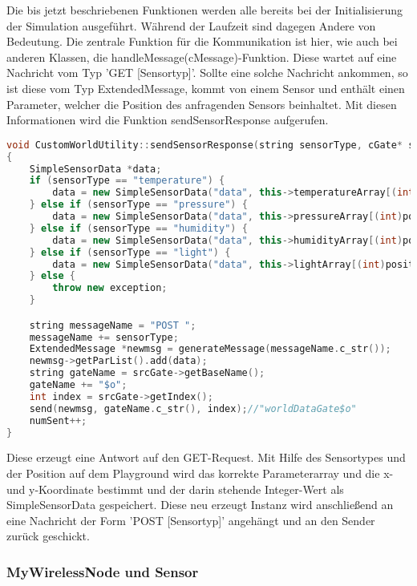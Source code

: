 Die bis jetzt beschriebenen Funktionen werden alle bereits bei der Initialisierung der Simulation ausgeführt. Während der Laufzeit sind dagegen Andere von Bedeutung. Die zentrale Funktion für die Kommunikation ist hier, wie auch bei anderen Klassen, die handleMessage(cMessage)-Funktion. \newline
Diese wartet auf eine Nachricht vom Typ 'GET [Sensortyp]'. Sollte eine solche Nachricht ankommen, so ist diese vom Typ ExtendedMessage, kommt von einem Sensor und enthält einen Parameter, welcher die Position des anfragenden Sensors beinhaltet. Mit diesen Informationen wird die Funktion sendSensorResponse aufgerufen.

\begin{lstlisting}[language=C++]
void CustomWorldUtility::sendSensorResponse(string sensorType, cGate* srcGate, SimpleCoord* position)
{
    SimpleSensorData *data;
    if (sensorType == "temperature") {
        data = new SimpleSensorData("data", this->temperatureArray[(int)position->x][(int)position->y]);
    } else if (sensorType == "pressure") {
        data = new SimpleSensorData("data", this->pressureArray[(int)position->x][(int)position->y]);
    } else if (sensorType == "humidity") {
        data = new SimpleSensorData("data", this->humidityArray[(int)position->x][(int)position->y]);
    } else if (sensorType == "light") {
        data = new SimpleSensorData("data", this->lightArray[(int)position->x][(int)position->y]);
    } else {
        throw new exception;
    }

    string messageName = "POST ";
    messageName += sensorType;
    ExtendedMessage *newmsg = generateMessage(messageName.c_str());
    newmsg->getParList().add(data);
    string gateName = srcGate->getBaseName();
    gateName += "$o";
    int index = srcGate->getIndex();
    send(newmsg, gateName.c_str(), index);//"worldDataGate$o"
    numSent++;
}
\end{lstlisting}

Diese erzeugt eine Antwort auf den GET-Request. Mit Hilfe des Sensortypes und der Position auf dem Playground wird das korrekte Parameterarray und die x- und y-Koordinate bestimmt und der darin stehende Integer-Wert als SimpleSensorData gespeichert.
Diese neu erzeugt Instanz wird anschließend an eine Nachricht der Form 'POST [Sensortyp]' angehängt und an den Sender zurück geschickt.

\subsubsection{MyWirelessNode und Sensor}

